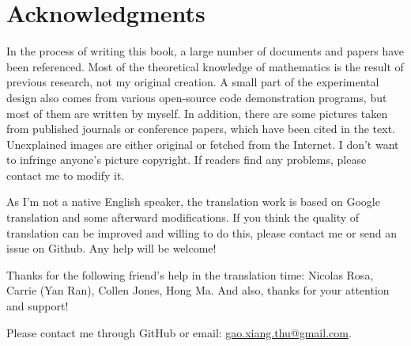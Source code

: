 \chapter*{Acknowledgments}
In the process of writing this book, a large number of documents and papers have been referenced. Most of the theoretical knowledge of mathematics is the result of previous research, not my original creation. A small part of the experimental design also comes from various open-source code demonstration programs, but most of them are written by myself. In addition, there are some pictures taken from published journals or conference papers, which have been cited in the text. Unexplained images are either original or fetched from the Internet. I don’t want to infringe anyone’s picture copyright. If readers find any problems, please contact me to modify it. 

As I'm not a native English speaker, the translation work is based on Google translation and some afterward modifications. If you think the quality of translation can be improved and willing to do this, please contact me or send an issue on Github. Any help will be welcome!

Thanks for the following friend's help in the translation time: Nicolas Rosa, Carrie (Yan Ran), Collen Jones, Hong Ma. And also, thanks for your attention and support!

Please contact me through GitHub or email: \href{mailto:gao.xiang.thu@gmail.com}{gao.xiang.thu@gmail.com}.
